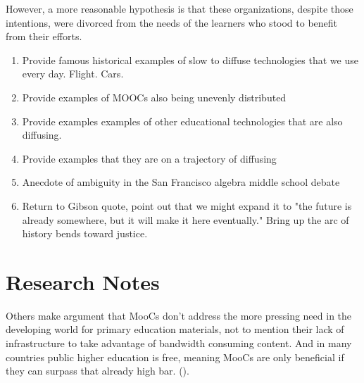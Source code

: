 \documentclass[
	letterpaper, %
]{jdf}
\begin{document}
However, a more reasonable hypothesis is that these organizations, despite those intentions, were divorced from the needs of the learners who stood to benefit from their efforts.

\begin{enumerate}
    \item Provide famous historical examples of slow to diffuse technologies that we use every day. Flight. Cars. 
    \item Provide examples of MOOCs also being unevenly distributed
    \item Provide examples examples of other educational technologies that are also diffusing.
    \item Provide examples that they are on a trajectory of diffusing
    \item Anecdote of ambiguity in the San Francisco algebra middle school debate
    \item Return to Gibson quote, point out that we might expand it to "the future is already somewhere, but it will make it here eventually." Bring up the arc of history bends toward justice. 
\end{enumerate}


\section{Research Notes}


Others make argument that MooCs don't address the more pressing need in the developing world for primary education materials, not to mention their lack of infrastructure to take advantage of bandwidth consuming content. And in many countries public higher education is free, meaning MooCs are only beneficial if they can surpass that already high bar.
(\cite{bates2014moocs}).

\end{document}
